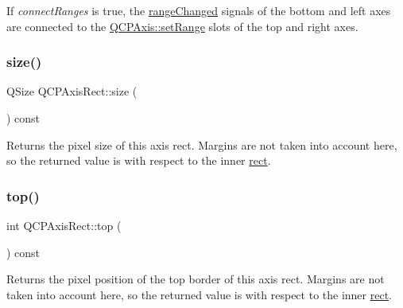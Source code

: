 If {\itshape connect\+Ranges} is true, the \mbox{\hyperlink{class_q_c_p_axis_a0894084e4c16a1736534c4095746f910}{range\+Changed}} signals of the bottom and left axes are connected to the \mbox{\hyperlink{class_q_c_p_axis_aebdfea5d44c3a0ad2b4700cd4d25b641}{Q\+C\+P\+Axis\+::set\+Range}} slots of the top and right axes. \mbox{\label{class_q_c_p_axis_rect_a7a8289346eb612f422c704f8b75cf479}} 
\subsubsection{\texorpdfstring{size()}{size()}}
{\footnotesize\ttfamily Q\+Size Q\+C\+P\+Axis\+Rect\+::size (\begin{DoxyParamCaption}{ }\end{DoxyParamCaption}) const\hspace{0.3cm}{\ttfamily [inline]}}

Returns the pixel size of this axis rect. Margins are not taken into account here, so the returned value is with respect to the inner \mbox{\hyperlink{class_q_c_p_layout_element_a208effccfe2cca4a0eaf9393e60f2dd4}{rect}}. \mbox{\label{class_q_c_p_axis_rect_a45dbad181cbb9f09d068dbb76c817c95}} 
\subsubsection{\texorpdfstring{top()}{top()}}
{\footnotesize\ttfamily int Q\+C\+P\+Axis\+Rect\+::top (\begin{DoxyParamCaption}{ }\end{DoxyParamCaption}) const\hspace{0.3cm}{\ttfamily [inline]}}

Returns the pixel position of the top border of this axis rect. Margins are not taken into account here, so the returned value is with respect to the inner \mbox{\hyperlink{class_q_c_p_layout_element_a208effccfe2cca4a0eaf9393e60f2dd4}{rect}}. \mbox{\label{class_q_c_p_axis_rect_a5a847b3ddeca3abec38d3838fefb0dbd}} 
